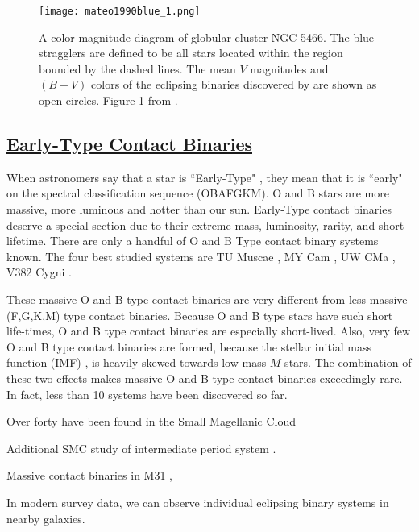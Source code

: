 \documentclass[12pt]{article} %
\numberwithin{equation}{section} %
\begin{document}
\begin{figure}[H]
\centering
\texttt{[image: mateo1990blue\_1.png]}
\caption{A color-magnitude diagram of globular cluster NGC 5466. The blue stragglers are defined to be all stars located within the region bounded by the dashed lines. The mean $V$ magnitudes and $(B - V)$ colors of the eclipsing binaries discovered by \citet{mateo1990blue} are shown as open circles. Figure 1 from \citet{mateo1990blue}.}
\label{fig: mateo1990blue_1}
\end{figure}

\subsection[Early-Type Contact Binaries]{\hyperlink{to}{Early-Type Contact Binaries}}

When astronomers say that a star is ``Early-Type" , they mean that it is ``early" on the spectral classification sequence (OBAFGKM). O and B stars are more massive, more luminous and hotter than our sun. Early-Type contact binaries deserve a special section due to their extreme mass, luminosity, rarity, and short lifetime. There are only a handful of O and B Type contact binary systems known. The four best studied systems are TU Muscae \citep{penny2008tomographic}, MY Cam \citep{lorenzo2014my}, UW CMa \citep{antokhina2011light}, V382 Cygni \citep{popper1978masses}. 

These massive O and B type contact binaries are very different from less massive (F,G,K,M) type contact binaries. Because O and B type stars have such short life-times, O and B type contact binaries are especially short-lived. Also, very few O and B type contact binaries are formed, because the stellar initial mass function (IMF) , is heavily skewed towards low-mass $M$ stars. The combination of these two effects makes massive O and B type contact binaries exceedingly rare. In fact, less than 10 systems have been discovered so far.

Over forty have been found in the Small Magellanic Cloud \citep{hilditch2005forty} 

Additional SMC study of intermediate period system \citep{priya2013photometric}.

Massive contact binaries in M31 \citep{lee2014properties}, \citep{vilardell2006eclipsing}

In modern survey data, we can observe individual eclipsing binary systems in nearby galaxies.
\end{document}
